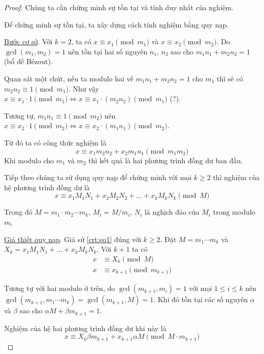 \begin{proof}
	Chúng ta cần chứng minh sự tồn tại và tính duy nhất của nghiệm.
	
	Để chứng minh sự tồn tại, ta xây dựng cách tính nghiệm bằng quy nạp.
	
	\underline{Bước cơ sở}. Với $k=2$, ta có $x \equiv x_1 \pmod{m_1}$ và $x \equiv x_2 \pmod{m_2}$. Do $\gcd(m_1, m_2) = 1$ nên tồn tại hai số nguyên $n_1$, $n_2$ sao cho $m_1 n_1 + m_2 n_2 = 1$ (bổ đề Bézout).
	
	Quan sát một chút, nếu ta modulo hai vế $m_1 n_1 + m_2 n_2 = 1$ cho $m_1$ thì sẽ có $m_2 n_2 \equiv 1 \pmod{m_1}$. Như vậy $x \equiv x_1 \cdot 1 \pmod{m_1} \Leftrightarrow x \equiv x_1 \cdot (m_2 n_2) \pmod{m_1}$ (?).
	
	Tương tự, $m_1 n_1 \equiv 1 \pmod{m_2}$ nên $x \equiv x_2 \cdot 1 \pmod{m_2} \Leftrightarrow x \equiv x_2 \cdot (m_1 n_1) \pmod{m_2}$.
	
	Từ đó ta có công thức nghiệm là \[x \equiv x_1 m_2 n_2 + x_2 m_1 n_1 \pmod{m_1 m_2}\]
	Khi modulo cho $m_1$ và $m_2$ thì kết quả là hai phương trình đồng dư ban đầu.
	
	Tiếp theo chúng ta sử dụng quy nạp để chứng minh với mọi $k \geqslant 2$ thì nghiệm của hệ phương trình đồng dư là
	\begin{equation}
		\label{crt:eq1}
		x \equiv x_1 M_1 N_1 + x_2 M_2 N_2 + \ldots + x_k M_k N_k \pmod{M}
	\end{equation}
	
	Trong đó $M = m_1 \cdot m_2 \cdots m_k$, $M_i = M / m_i$, $N_i$ là nghịch đảo của $M_i$ trong modulo $m_i$
	
	\underline{Giả thiết quy nạp}. Giả sử \ref{crt:eq1} đúng với $k \geqslant 2$. Đặt $M = m_1 \cdots m_k$ và $X_k = x_1 M_1 N_1 + \ldots +  x_k M_k N_k$. Với $k+1$ ta có
	\begin{align*}
		x & \equiv X_k \pmod{M} \\ x & \equiv x_{k+1} \pmod{m_{k+1}}
	\end{align*}
	
	Tương tự với hai modulo ở trên, do $\gcd(m_{k+1}, m_i) = 1$ với mọi $1 \leqslant i \leqslant k$ nên $\gcd(m_{k+1}, m_1 \cdots m_k) = \gcd(m_{k+1}, M) = 1$. Khi đó tồn tại các số nguyên $\alpha$ và $\beta$ sao cho $\alpha M + \beta m_{k+1} = 1$.
	
	Nghiệm của hệ hai phương trình đồng dư khi này là
	\begin{equation*}
		x \equiv X_k \beta m_{k+1} + x_{k+1} \alpha M \pmod{M \cdot m_{k+1}}
	\end{equation*}
	

\end{proof}
